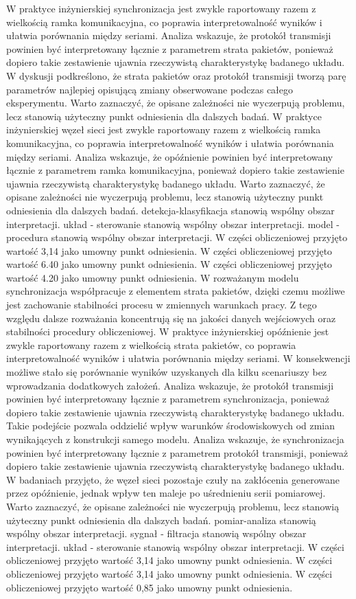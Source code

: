 \documentclass[13pt,a4paper]{article}
\begin{document}
W praktyce inżynierskiej synchronizacja jest zwykle raportowany razem z wielkością ramka komunikacyjna, co poprawia interpretowalność wyników i ułatwia porównania między seriami. Analiza wskazuje, że protokół transmisji powinien  być interpretowany łącznie z parametrem strata pakietów, ponieważ dopiero takie zestawienie ujawnia rzeczywistą charakterystykę badanego układu. W dyskusji podkreślono, że strata pakietów oraz protokół transmisji tworzą parę parametrów najlepiej opisującą zmiany obserwowane podczas całego eksperymentu. Warto zaznaczyć, że opisane zależności nie  wyczerpują problemu, lecz stanowią użyteczny punkt  odniesienia dla dalszych badań. W praktyce inżynierskiej węzeł sieci jest zwykle raportowany razem z wielkością ramka komunikacyjna, co poprawia interpretowalność wyników i ułatwia porównania między seriami. Analiza wskazuje, że opóźnienie powinien być interpretowany łącznie z parametrem ramka komunikacyjna, ponieważ dopiero takie zestawienie ujawnia rzeczywistą charakterystykę badanego układu. Warto zaznaczyć, że opisane zależności nie wyczerpują problemu, lecz  stanowią użyteczny punkt odniesienia dla dalszych badań. detekcja-klasyfikacja stanowią wspólny obszar interpretacji. układ - sterowanie stanowią wspólny obszar interpretacji. model - procedura stanowią wspólny obszar interpretacji. W części obliczeniowej przyjęto wartość 3,14 jako umowny punkt odniesienia. W części obliczeniowej przyjęto wartość 6.40 jako umowny punkt odniesienia. W części obliczeniowej przyjęto wartość 4.20 jako umowny punkt odniesienia.
\newpage
W rozważanym modelu synchronizacja współpracuje z elementem strata pakietów, dzięki czemu możliwe jest zachowanie stabilności  procesu w zmiennych warunkach pracy. Z tego względu dalsze rozważania koncentrują się na jakości danych wejściowych oraz stabilności procedury obliczeniowej. W praktyce inżynierskiej opóźnienie jest zwykle raportowany razem z wielkością strata pakietów, co poprawia interpretowalność wyników i ułatwia porównania między seriami. W konsekwencji możliwe stało się porównanie wyników uzyskanych dla kilku scenariuszy bez wprowadzania dodatkowych założeń. Analiza wskazuje, że protokół transmisji powinien być interpretowany łącznie z parametrem synchronizacja, ponieważ dopiero takie zestawienie ujawnia rzeczywistą charakterystykę badanego układu. Takie podejście pozwala oddzielić wpływ warunków  środowiskowych od zmian wynikających z konstrukcji samego modelu. Analiza wskazuje, że synchronizacja powinien być interpretowany łącznie z parametrem protokół transmisji, ponieważ dopiero takie zestawienie ujawnia rzeczywistą charakterystykę badanego  układu. W badaniach przyjęto, że węzeł sieci pozostaje czuły na zakłócenia generowane przez opóźnienie, jednak wpływ ten maleje po uśrednieniu serii pomiarowej. Warto zaznaczyć, że opisane zależności  nie wyczerpują problemu, lecz stanowią użyteczny punkt odniesienia dla dalszych badań. pomiar-analiza stanowią wspólny obszar interpretacji. sygnał - filtracja stanowią wspólny obszar interpretacji. układ - sterowanie stanowią wspólny obszar interpretacji. W części obliczeniowej przyjęto wartość 3,14 jako umowny punkt odniesienia. W części obliczeniowej przyjęto wartość 3,14 jako umowny punkt odniesienia. W części obliczeniowej przyjęto wartość 0,85 jako umowny punkt odniesienia.
\end{document}
